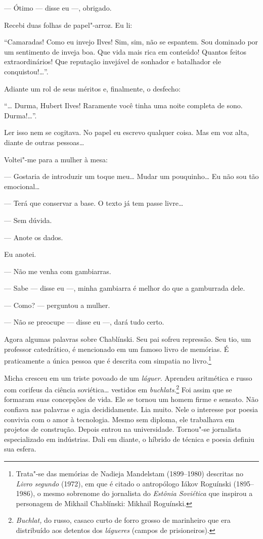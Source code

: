 --- Ótimo --- disse eu ---, obrigado.

Recebi duas folhas de papel"-arroz. Eu li:

``Camaradas! Como eu invejo Ilves! Sim, sim, não se espantem. Sou
dominado por um sentimento de inveja boa. Que vida mais rica em
conteúdo! Quantos feitos extraordinários! Que reputação invejável de
sonhador e batalhador ele conquistou!\ldots{}''.

Adiante um rol de seus méritos e, finalmente, o desfecho:

``\ldots{} Durma, Hubert Ilves! Raramente você tinha uma noite completa de
sono. Durma!\ldots{}''.

Ler isso nem se cogitava. No papel eu escrevo qualquer coisa. Mas em voz
alta, diante de outras pessoas\ldots{}

Voltei"-me para a mulher à mesa:

--- Gostaria de introduzir um toque meu\ldots{} Mudar um pouquinho\ldots{} Eu não
sou tão emocional\ldots{}

--- Terá que conservar a base. O texto já tem passe livre\ldots{}

--- Sem dúvida.

--- Anote os dados.

Eu anotei.

--- Não me venha com gambiarras.

--- Sabe --- disse eu ---, minha gambiarra é melhor do que a gamburrada
dele.

--- Como? --- perguntou a mulher.

--- Não se preocupe --- disse eu ---, dará tudo certo.

Agora algumas palavras sobre Chablínski. Seu pai sofreu repressão. Seu
tio, um professor catedrático, é mencionado em um famoso livro de
memórias. É praticamente a única pessoa que é descrita com simpatia no
livro.\footnote{Trata"-se das memórias de Nadieja Mandelstam (1899--1980)
  descritas no \emph{Livro segundo} (1972), em que é citado o
  antropólogo Iákov Roguínski (1895--1986), o mesmo sobrenome do
  jornalista do \emph{Estônia Soviética} que inspirou a personagem de
  Mikhail Chablínski: Mikhail Roguínski.}

Micha cresceu em um triste povoado de um \emph{láguer}. Aprendeu
aritmética e russo com corifeus da ciência soviética\ldots{} vestidos em
\emph{buchlats}.\footnote{\emph{Buchlat,} do russo, casaco curto de
  forro grosso de marinheiro que era distribuído aos detentos dos
  \emph{lágueres} (campos de prisioneiros).} Foi assim que se formaram
suas concepções de vida. Ele se tornou um homem firme e sensato. Não
confiava nas palavras e agia decididamente. Lia muito. Nele o interesse
por poesia convivia com o amor à tecnologia. Mesmo sem diploma, ele
trabalhava em projetos de construção. Depois entrou na universidade.
Tornou"-se jornalista especializado em indústrias. Dali em diante, o
híbrido de técnica e poesia definiu sua esfera.

